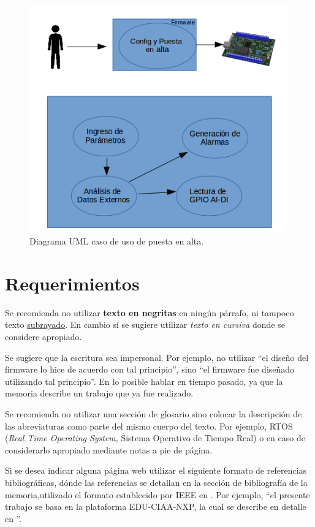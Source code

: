 \begin{figure}[h!]
	\centering
	\includegraphics[width=.8\textwidth]{Figures/caso_uso_Alta_UML}
	\caption{Diagrama UML caso de uso de puesta en alta.}
	\label{fig:casoUsoAlta}
\end{figure}


\section{Requerimientos}
\label{sec:Requerimientos}


Se recomienda no utilizar \textbf{texto en negritas} en ningún párrafo, ni tampoco texto \underline{subrayado}. En cambio sí se sugiere utilizar \textit{texto en cursiva} donde se considere apropiado.

Se sugiere que la escritura sea impersonal. Por ejemplo, no utilizar ``el diseño del firmware lo hice de acuerdo con tal principio'', sino ``el firmware fue diseñado utilizando tal principio''. En lo posible hablar en tiempo pasado, ya que la memoria describe un trabajo que ya fue realizado.

Se recomienda no utilizar una sección de glosario sino colocar la descripción de las abreviaturas como parte del mismo cuerpo del texto. Por ejemplo, RTOS (\textit{Real Time Operating System}, Sistema Operativo de Tiempo Real) o en caso de considerarlo apropiado mediante notas a pie de página.

Si se desea indicar alguna página web utilizar el siguiente formato de referencias bibliográficas, dónde las referencias se detallan en la sección de bibliografía de la memoria,utilizado el formato establecido por IEEE en \citep{IEEE:citation}. Por ejemplo, ``el presente trabajo se basa en la plataforma EDU-CIAA-NXP, la cual se describe en detalle en \citep{CIAA}''.

